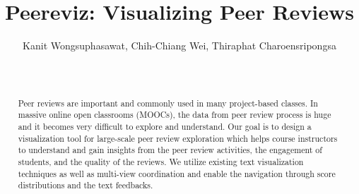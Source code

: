 \documentclass{sigchi}
\begin{document}
\title{Peereviz: Visualizing Peer Reviews}


\author{
  \alignauthor Kanit Wongsuphasawat, Chih-Chiang Wei, Thiraphat Charoensripongsa\\
    \\
    \\
}



\maketitle

\begin{abstract}


Peer reviews are important and commonly used in many project-based classes. In
massive online open classrooms (MOOCs), the data from peer review process is
huge and it becomes very difficult to explore and understand. Our goal is to
design a visualization tool for large-scale peer review exploration which helps
course instructors to understand and gain insights from the peer review
activities, the engagement of students, and the quality of the reviews. We
utilize existing text visualization techniques as well as multi-view
coordination and enable the navigation through score distributions and the text
feedbacks.

\end{abstract}



\end{document}
